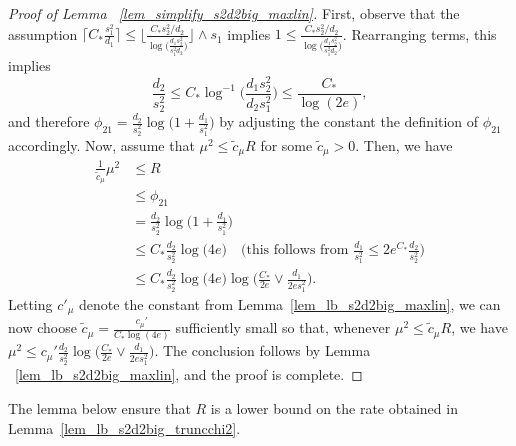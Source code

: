 \documentclass{article}
\newcommand{\Ct}{C_{*}}
\newcommand{\pa}[1]{{\color{red}Parker: #1}}
\theoremstyle{remark}
\begin{document}
\begin{proof}[Proof of Lemma ~\ref{lem_simplify_s2d2big_maxlin}]
    First, observe that the assumption $\lceil \Ct \frac{s_1^2}{d_1}\rceil \leq \big\lfloor \frac{\Ct s_2^2/d_2}{\log\big(\frac{d_1s_2^2}{s_1^2d_2}\big)}\big\rfloor\wedge s_1$ implies 
    $1 \leq \frac{\Ct s_2^2/d_2}{\log\big(\frac{d_1s_2^2}{s_1^2d_2}\big)}$. Rearranging terms, this implies 
    $$\frac{d_2}{s_2^2} \leq \Ct\log^{-1} \big(\frac{d_1s_2^2}{d_2s_1^2}\big) \leq \frac{\Ct}{\log(2e)},$$
     and therefore $\phi_{21} = \frac{d_2}{s_2^2}\log\big(1 + \frac{d_1}{s_1^2}\big)$ by adjusting the constant the definition of $\phi_{21}$ accordingly. Now, assume that $\mu^2 \leq \widetilde c_\mu R$ for some $\widetilde c_\mu>0$. Then, we have
        \begin{align*}
            \frac{1}{\widetilde c_\mu}\mu^2 &\leq R \\
            &\leq \phi_{21} \\
            &= \frac{d_2}{s_2^2}\log\big(1 + \frac{d_1}{s_1^2}\big) \\
            &\leq \Ct\frac{d_2}{s_2^2}\log\big(4e\big) \quad \text{(this follows from $\frac{d_1}{s_1^2}\leq 2e^{\Ct} \frac{d_2}{s_2^2}$)} \\
            &\leq \Ct\frac{d_2}{s_2^2}\log\big(4e\big)\log\big(\frac{\Ct}{2e}\vee \frac{d_1}{2es^2_1}\big).
        \end{align*}
        Letting $c'_\mu$ denote the constant from Lemma~\ref{lem_lb_s2d2big_maxlin}, we can now choose $\widetilde c_\mu = \frac{c_\mu'}{\Ct \log(4e)} $ sufficiently small so that, whenever $\mu^2 \leq \widetilde c_\mu R$, we have $\mu^2 \leq c_\mu' \frac{d_2}{s_2^2}\log\big(\frac{\Ct}{2e}\vee \frac{d_1}{2es^2_1}\big)$.         
        The conclusion follows by Lemma ~\ref{lem_lb_s2d2big_maxlin}, and the proof is complete. %
\end{proof}
The lemma below ensure that $R$ is a lower bound on the rate obtained in Lemma~\ref{lem_lb_s2d2big_truncchi2}.
\end{document}
